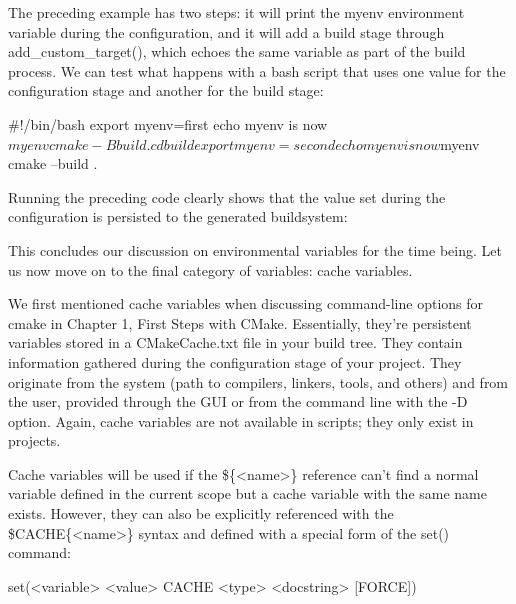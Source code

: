 The preceding example has two steps: it will print the myenv environment variable during the configuration, and it will add a build stage through add\_custom\_target(), which echoes the same variable as part of the build process. We can test what happens with a bash script that uses one value for the configuration stage and another for the build stage:


\begin{shell}
#!/bin/bash
export myenv=first
echo myenv is now $myenv
cmake -B build .
cd build
export myenv=second
echo myenv is now $myenv
cmake --build .
\end{shell}

Running the preceding code clearly shows that the value set during the configuration is persisted to the generated buildsystem:


This concludes our discussion on environmental variables for the time being. Let us now move on to the final category of variables: cache variables.


We first mentioned cache variables when discussing command-line options for cmake in Chapter 1, First Steps with CMake. Essentially, they’re persistent variables stored in a CMakeCache.txt file in your build tree. They contain information gathered during the configuration stage of your project. They originate from the system (path to compilers, linkers, tools, and others) and from the user, provided through the GUI or from the command line with the -D option. Again, cache variables are not available in scripts; they only exist in projects.

Cache variables will be used if the \$\{<name>\} reference can’t find a normal variable defined in the current scope but a cache variable with the same name exists. However, they can also be explicitly referenced with the \$CACHE\{<name>\} syntax and defined with a special form of the set() command:

\begin{cmake}
set(<variable> <value> CACHE <type> <docstring> [FORCE])
\end{cmake}

